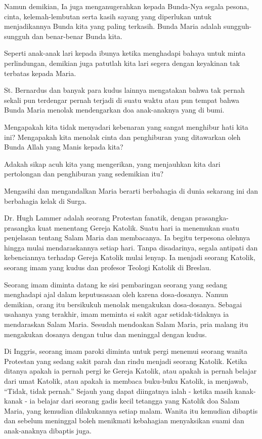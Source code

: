 Namun demikian, Ia juga menganugerahkan kepada Bunda-Nya segala pesona, cinta, kelemah-lembutan serta kasih sayang yang diperlukan untuk menjadikannya Bunda kita yang paling terkasih. Bunda Maria adalah sungguh-sungguh dan benar-benar Bunda kita.
 
Seperti anak-anak lari kepada ibunya ketika menghadapi bahaya untuk minta perlindungan, demikian juga patutlah kita lari segera dengan keyakinan tak terbatas kepada Maria.
 
St. Bernardus dan banyak para kudus lainnya mengatakan bahwa tak pernah sekali pun terdengar pernah terjadi di suatu waktu atau pun tempat bahwa Bunda Maria menolak mendengarkan doa anak-anaknya yang di bumi.
 
Mengapakah kita tidak menyadari kebenaran yang sangat menghibur hati kita ini? Mengapakah kita menolak cinta dan penghiburan yang ditawarkan oleh Bunda Allah yang Manis kepada kita?
 
Adakah sikap acuh kita yang mengerikan, yang menjauhkan kita dari pertolongan dan penghiburan yang sedemikian itu?
 
Mengasihi dan mengandalkan Maria berarti berbahagia di dunia sekarang ini dan berbahagia kelak di Surga.


Dr. Hugh Lammer adalah seorang Protestan fanatik, dengan prasangka-prasangka kuat menentang Gereja Katolik. Suatu hari ia menemukan suatu penjelasan tentang Salam Maria dan membacanya. Ia begitu terpesona olehnya hingga mulai mendaraskannya setiap hari. Tanpa disadarinya, segala antipati dan kebenciannya terhadap Gereja Katolik mulai lenyap. Ia menjadi seorang Katolik, seorang imam yang kudus dan profesor Teologi Katolik di Breslau.


Seorang imam diminta datang ke sisi pembaringan seorang yang sedang menghadapi ajal dalam keputusasaan oleh karena dosa-dosanya. Namun demikian, orang itu bersikukuh menolak mengakukan dosa-dosanya. Sebagai usahanya yang terakhir, imam meminta si sakit agar setidak-tidaknya ia mendaraskan Salam Maria. Sesudah mendoakan Salam Maria, pria malang itu mengakukan dosanya dengan tulus dan meninggal dengan kudus.
 
Di Inggris, seorang imam paroki diminta untuk pergi menemui seorang wanita Protestan yang sedang sakit parah dan rindu menjadi seorang Katolik. Ketika ditanya apakah ia pernah pergi ke Gereja Katolik, atau apakah ia pernah belajar dari umat Katolik, atau apakah ia membaca buku-buku Katolik, ia menjawab, “Tidak, tidak pernah.” Sejauh yang dapat diingatnya ialah - ketika masih kanak-kanak - ia belajar dari seorang gadis kecil tetangga yang Katolik doa Salam Maria, yang kemudian dilakukannya setiap malam. Wanita itu kemudian dibaptis dan sebelum meninggal boleh menikmati kebahagian menyaksikan suami dan anak-anaknya dibaptis juga.


